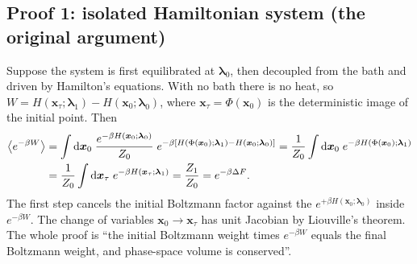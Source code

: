 \documentclass[11pt,a4paper]{article}
\newcommand{\dd}{\mathrm{d}}
\newcommand{\avg}[1]{\left\langle #1\right\rangle}
\newcommand{\lam}{\bm{\lambda}}
\begin{document}
\subsection{Proof 1: isolated Hamiltonian system (the original argument)}
Suppose the system is first equilibrated at $\lam_0$, then decoupled from the bath and driven by
Hamilton's equations. With no bath there is no heat, so
$W=H(\bm x_\tau;\lam_1)-H(\bm x_0;\lam_0)$, where $\bm x_\tau=\Phi(\bm x_0)$ is the deterministic
image of the initial point. Then
\begin{align}
\avg{e^{-\beta W}}
&=\int\dd\bm x_0\;\frac{e^{-\beta H(\bm x_0;\lam_0)}}{Z_0}\;
e^{-\beta[H(\Phi(\bm x_0);\lam_1)-H(\bm x_0;\lam_0)]}
=\frac1{Z_0}\int\dd\bm x_0\;e^{-\beta H(\Phi(\bm x_0);\lam_1)}\notag\\
&=\frac1{Z_0}\int\dd\bm x_\tau\;e^{-\beta H(\bm x_\tau;\lam_1)}=\frac{Z_1}{Z_0}=e^{-\beta\Delta F}.
\end{align}
The first step cancels the initial Boltzmann factor against the $e^{+\beta H(\bm x_0;\lam_0)}$ inside
$e^{-\beta W}$. The change of variables $\bm x_0\to\bm x_\tau$ has unit Jacobian by Liouville's theorem. The whole proof is
``the initial Boltzmann weight times $e^{-\beta W}$ equals the final Boltzmann weight, and phase-space volume is conserved''.
\end{document}
